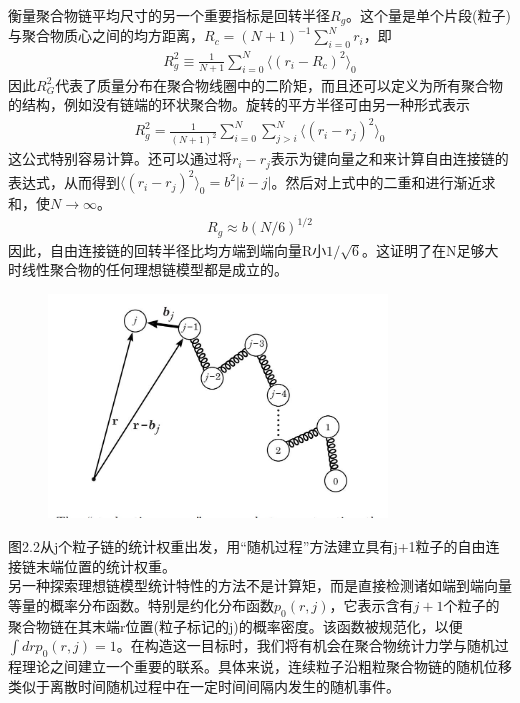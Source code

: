 衡量聚合物链平均尺寸的另一个重要指标是回转半径$R_{g}$。这个量是单个片段(粒子)与聚合物质心之间的均方距离，$R_{c}=(N+1)^{-1} \sum _{i=0}^{N} r_{i}$，即\\
\begin{gather}
R_{g}^2 \equiv \frac{1}{N+1} \sum _{i=0}^{N} \langle (r_{i}- R_{c})^2 \rangle_{0} 
\end{gather}
因此$R_{G}^2$代表了质量分布在聚合物线圈中的二阶矩，而且还可以定义为所有聚合物的结构，例如没有链端的环状聚合物。旋转的平方半径可由另一种形式表示\\
\begin{gather}
R_{g}^2=\frac{1}{(N+1)^2} \sum _{i=0}^{N} \sum _{j>i}^{N} \langle (r_{i}- r_{j})^2 \rangle_{0} 
\end{gather}
这公式特别容易计算。还可以通过将$r_{i}-r_{j}$表示为键向量之和来计算自由连接链的表达式，从而得到$\langle (r_{i}- r_{j})^2 \rangle_{0}=b^2 |i-j|$。然后对上式中的二重和进行渐近求和，使$N \rightarrow \infty $。\\
\begin{gather}
R_{g} \approx b(N/6)^{1/2}
\end{gather}
因此，自由连接链的回转半径比均方端到端向量R小$1/\sqrt{6}$。这证明了在N足够大时线性聚合物的任何理想链模型都是成立的。\\
\begin{figure}
				\caption{ }
				\centering
				\includegraphics[width=9cm]{./figures/3.png}
			\end{figure}
图2.2从j个粒子链的统计权重出发，用“随机过程”方法建立具有j+1粒子的自由连接链末端位置的统计权重。\\

另一种探索理想链模型统计特性的方法不是计算矩，而是直接检测诸如端到端向量等量的概率分布函数。特别是约化分布函数$p_{0}(r,j)$，它表示含有$j+1$个粒子的聚合物链在其末端r位置(粒子标记的j)的概率密度。该函数被规范化，以便$\int drp_0(r,j)=1$。在构造这一目标时，我们将有机会在聚合物统计力学与随机过程理论之间建立一个重要的联系。具体来说，连续粒子沿粗粒聚合物链的随机位移类似于离散时间随机过程中在一定时间间隔内发生的随机事件。\\

